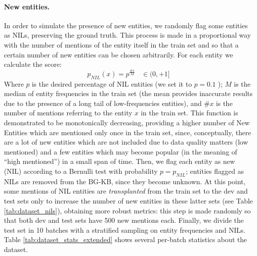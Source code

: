 \paragraph{New entities.}
In order to simulate the presence of new entities, we randomly flag some entities as NILs, preserving the ground truth.
This process is made in a proportional way with the number of mentions of the entity itself in the train set and so that a certain number of new entities can be chosen arbitrarily.
For each entity we calculate the score:
\begin{equation}
    p_{NIL}(x) = p^\frac{\#x}{M} \hspace{10pt} \in (0, +1]
\end{equation}
Where $p$ is the desired percentage of NIL entities (we set it to $p = 0.1$ \cite{agarwal-etal-2022-entity}); $M$ is the median of entity frequencies in the train set (the mean provides inaccurate results due to the presence of a long tail of low-frequencies entities), and $\#x$ is the number of mentions referring to the entity $x$ in the train set.
This function is demonstrated to be monotonically decreasing, providing a higher number of New Entities which are mentioned only once in the train set, since, conceptually, there are a lot of new entities which are not included due to data quality matters (low mentioned) and a few entities which may become popular (in the meaning of ``high mentioned'') in a small span of time. \newline
Then, we flag each entity as new (NIL) according to a Bernulli test with probability $p = p_{NIL}$; entities flagged as NILs are removed from the BG-KB, since they become unknown.
At this point, some mentions of NIL entities are \textit{transplanted} from the train set to the dev and test sets only to increase the number of new entities in these latter sets (see Table \ref{tab:dataset_nils}), obtaining more robust metrics: this step is made randomly so that both dev and test sets have 500 new mentions each.
Finally, we divide the test set in 10 batches with a stratified sampling on entity frequencies and NILs. Table \ref{tab:dataset_stats_extended} shows several per-batch statistics about the dataset.

